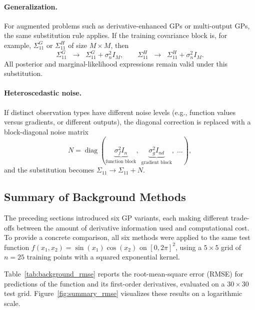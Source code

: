 \documentclass[12pt]{article}
\begin{document}
\paragraph{Generalization.}
For augmented problems such as derivative-enhanced GPs or multi-output GPs, 
the same substitution rule applies. 
If the training covariance block is, for example, $\Sigma^{G}_{11}$ or $\Sigma^{H}_{11}$ 
of size $M \times M$, then
\[
\Sigma^{G}_{11} \;\;\longrightarrow\;\; \Sigma^{G}_{11} + \sigma_n^2 I_{M}, 
\qquad
\Sigma^{H}_{11} \;\;\longrightarrow\;\; \Sigma^{H}_{11} + \sigma_n^2 I_{M}.
\]
All posterior and marginal-likelihood expressions remain valid under this substitution.

\paragraph{Heteroscedastic noise.}
If distinct observation types have different noise levels (e.g., function values 
versus gradients, or different outputs), the diagonal correction is replaced with a 
block-diagonal noise matrix
\[
N = \operatorname{diag}(\underbrace{\sigma_{f}^2 I_{n}}_{\text{function block}},\; 
\underbrace{\sigma_{g}^2 I_{n d}}_{\text{gradient block}},\; \ldots),
\]
and the substitution becomes $\Sigma_{11} \to \Sigma_{11} + N$.

\subsection{Summary of Background Methods}
\label{subsec:background_summary}

The preceding sections introduced six GP variants, each making different trade-offs between the amount of derivative information used and computational cost. To provide a concrete comparison, all six methods were applied to the same test function $f(x_1, x_2) = \sin(x_1)\cos(x_2)$ on $[0, 2\pi]^2$, using a $5 \times 5$ grid of $n = 25$ training points with a squared exponential kernel.

Table~\ref{tab:background_rmse} reports the root-mean-square error (RMSE) for predictions of the function and its first-order derivatives, evaluated on a $30 \times 30$ test grid. Figure~\ref{fig:summary_rmse} visualizes these results on a logarithmic scale.
\end{document}
